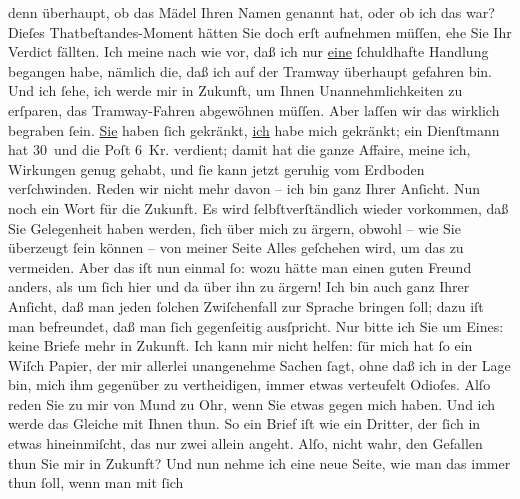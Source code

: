 \begin{ledgroupsized}[t]{13cm}
               denn überhaupt, ob das Mädel
               Ihren Namen genannt hat, oder ob ich das war? Dieſes Thatbeſtandes-Moment hätten Sie
               doch erſt aufnehmen müſſen, ehe Sie Ihr Verdict fällten. Ich meine nach wie vor, daß
               ich nur \uline{eine} ſchuldhafte Handlung begangen habe,
               nämlich die, daß ich auf der Tramway überhaupt gefahren bin. Und ich ſehe, ich werde
               mir in Zukunft, um Ihnen Unannehmlichkeiten zu erſparen, das Tramway-Fahren
               abgewöhnen müſſen.\pend
           \pstart
           Aber laſſen wir das wirklich begraben ſein. \uline{Sie} haben
               ſich gekränkt, \uline{ich} habe mich gekränkt; ein Dienſtmann
               hat 30 und die Poſt 6 Kr. verdient; damit hat die ganze Affaire, meine ich, Wirkungen
               genug gehabt, und ſie kann jetzt geruhig vom Erdboden verſchwinden. Reden wir nicht
               mehr davon – ich bin ganz Ihrer Anſicht.\pend
           \pstart
           Nun noch ein Wort für die Zukunft. Es wird ſelbſtverſtändlich wieder vorkommen, daß
               Sie Gelegenheit haben werden, ſich über mich zu ärgern, obwohl – wie Sie überzeugt
               ſein können – von meiner Seite Alles geſchehen wird, um das zu {\pb}vermeiden. Aber das iſt nun einmal
               ſo: wozu hätte man einen guten Freund anders, als um ſich hier und da über ihn zu
               ärgern! Ich bin auch ganz Ihrer Anſicht, daß man jeden ſolchen Zwiſchenfall zur
               Sprache bringen ſoll; dazu iſt man befreundet, daß man ſich gegenſeitig ausſpricht.
               Nur bitte ich Sie um Eines: keine Briefe mehr in Zukunft. Ich kann mir nicht  helfen: ſür mich hat ſo ein Wiſch Papier, der mir
                   allerlei unangenehme Sachen ſagt, ohne daß ich in der Lage bin, mich ihm
               gegenüber zu vertheidigen, immer etwas verteufelt Odioſes. Alſo reden Sie zu mir von
               Mund zu Ohr, wenn Sie etwas gegen mich haben. Und ich werde das Gleiche mit Ihnen
               thun. So ein Brief iſt wie ein Dritter, der ſich in etwas hineinmiſcht, das nur zwei
               allein angeht. Alſo, nicht wahr, den Gefallen thun Sie mir  in Zukunft?{\dotsfour}\pend
           \pstart
           {\pb}Und nun nehme ich eine neue Seite,
                   wie man das immer thun ſoll, wenn man mit ſich

\end{ledgroupsized}
